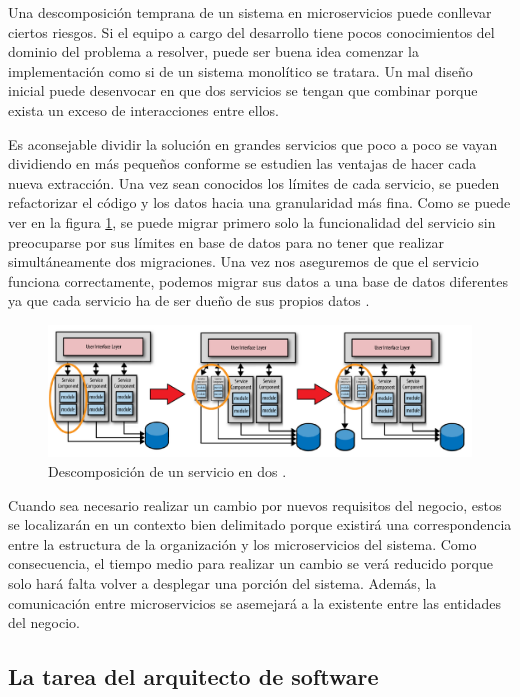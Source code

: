 \documentclass[11pt,spanish,listoffigures]{tfgetsinf}
\begin{document}
Una descomposición temprana de un sistema en microservicios puede conllevar ciertos riesgos. Si el equipo a cargo del desarrollo tiene pocos conocimientos del dominio del problema a resolver, puede  ser buena idea comenzar la implementación como si de un sistema monolítico se tratara. Un mal diseño inicial puede desenvocar en que dos servicios se tengan que combinar porque exista un exceso de interacciones entre ellos. 

Es aconsejable dividir la solución en grandes servicios que poco a poco se vayan dividiendo en más pequeños conforme se estudien las ventajas de hacer cada nueva extracción. Una vez sean conocidos los límites de cada servicio, se pueden refactorizar el código y los datos hacia una granularidad más fina. Como se puede ver en la figura \ref{fig:refactoring}, se puede migrar primero solo la funcionalidad del servicio sin preocuparse por sus límites en base de datos para no tener que realizar simultáneamente dos migraciones. Una vez nos aseguremos de que el servicio funciona correctamente, podemos migrar sus datos a una base de datos diferentes ya que cada servicio ha de ser dueño de sus propios datos \cite{Richards2016}.

\begin{figure}[h]
\centering
\includegraphics[scale=0.4]{refactoring}
\caption{Descomposición de un servicio en dos \cite{Richards2016}.}
\label{fig:refactoring}
\end{figure}

Cuando sea necesario realizar un cambio por nuevos requisitos del negocio, estos se localizarán en un contexto bien delimitado porque existirá una correspondencia entre la estructura de la organización y los microservicios del sistema. Como consecuencia, el tiempo medio para realizar un cambio se verá reducido porque solo hará falta volver a desplegar una porción del sistema. Además, la comunicación entre microservicios se asemejará a la existente entre las entidades del negocio.

\subsection{La tarea del arquitecto de software}
\end{document}
